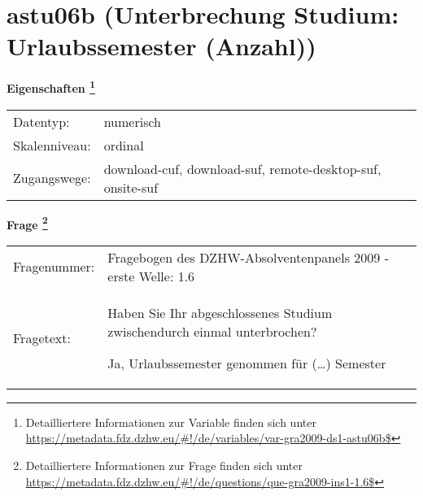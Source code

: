 
    \setcounter{footnote}{0}

    \vspace*{-1.8cm}
	\section{astu06b (Unterbrechung Studium: Urlaubssemester (Anzahl))}
	\label{section:astu06b}



    \vspace*{0.5cm}
    \noindent\textbf{Eigenschaften
	\footnote{Detailliertere Informationen zur Variable finden sich unter
		\url{https://metadata.fdz.dzhw.eu/\#!/de/variables/var-gra2009-ds1-astu06b$}}}\\
	\begin{tabularx}{\hsize}{@{}lX}
	Datentyp: & numerisch \\
	Skalenniveau: & ordinal \\
	Zugangswege: &
	  download-cuf, 
	  download-suf, 
	  remote-desktop-suf, 
	  onsite-suf
 \\
    \end{tabularx}



				\vspace*{0.5cm}
                \noindent\textbf{Frage
	                \footnote{Detailliertere Informationen zur Frage finden sich unter
		              \url{https://metadata.fdz.dzhw.eu/\#!/de/questions/que-gra2009-ins1-1.6$}}}\\
				\begin{tabularx}{\hsize}{@{}lX}
					Fragenummer: &
					  Fragebogen des DZHW-Absolventenpanels 2009 - erste Welle:
					  1.6
 \\
					Fragetext: & Haben Sie Ihr abgeschlossenes Studium zwischendurch einmal unterbrochen?\par  Ja, Urlaubssemester genommen für (…) Semester \\
				\end{tabularx}





